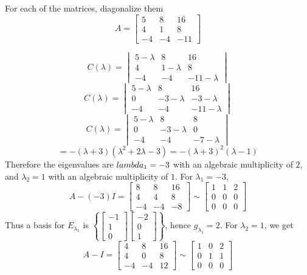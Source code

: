 \documentclass[english, 12pt]{article}
\begin{document}
\begin{exmp}
For each of the matrices, diagonalize them
\[A = \begin{bmatrix} 5 & 8 & 16 \\ 4 & 1 & 8 \\ -4 & -4 & -11 \end{bmatrix}\]
\begin{sol}
\[C(\lambda) = \begin{vmatrix} 5 - \lambda& 8 & 16 \\ 4 & 1 - \lambda& 8 \\ -4 & -4 & -11 - \lambda \end{vmatrix}\]
\[C(\lambda) = \begin{vmatrix} 5 - \lambda& 8 & 16 \\ 0 & -3 - \lambda& -3 - \lambda \\ -4 & -4 & -11 - \lambda \end{vmatrix}\]
\[C(\lambda) = \begin{vmatrix} 5 - \lambda& 8 & 8 \\ 0 & -3 - \lambda& 0 \\ -4 & -4 & -7 - \lambda \end{vmatrix}\]
\[= -(\lambda + 3)(\lambda^2 + 2\lambda - 3) = -(\lambda + 3)^2(\lambda - 1)\]
Therefore the eigenvalues are $\\lambda_1 = -3$ with an algebraic multiplicity of $2$, and $\lambda_2 = 1$ with an algebraic multiplicity of $1$. \n
For $\lambda_1 = -3$,
\[A - (-3)I = \begin{bmatrix} 8 & 8 & 16 \\ 4 & 4 & 8 \\ -4 & -4 & - 8\end{bmatrix} \sim \begin{bmatrix} 1 & 1 & 2 \\0 & 0 & 0 \\ 0 & 0 & 0 \end{bmatrix}\]
Thus a basis for $E_{\lambda_1}$ is $\left\{\begin{bmatrix} -1 \\ 1 \\ 0 \end{bmatrix} \begin{bmatrix} -2 \\ 0 \\ 1 \end{bmatrix} \right\}$, hence $g_{\lambda_1} = 2$. \n
For $\lambda_2 = 1$, we get
\[A - I = \begin{bmatrix} 4 & 8 & 16 \\ 4 & 0 & 8 \\ -4 & -4 & 12 \end{bmatrix} \sim \begin{bmatrix} 1 & 0 & 2 \\ 0 & 1 & 1 \\ 0 & 0 & 0 \end{bmatrix}\]

\end{sol}
\end{exmp}
\end{document}
